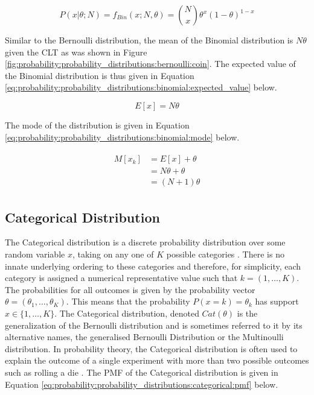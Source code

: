 \begin{equation}
    \label{eq:probability:probability_distributions:binomial:pmf}
    P(x \vert \theta; N) = f_{Bin}(x; N, \theta) = \binom{N}{x} \theta^{x}(1-\theta)^{1-x}
\end{equation}

Similar to the Bernoulli distribution, the mean of the Binomial distribution is $N\theta$ given the \ac{CLT} as was shown in Figure \ref{fig:probability:probability_distributions:bernoulli:coin}. The expected value of the Binomial distribution is thus given in Equation \ref{eq:probability:probability_distributions:binomial:expected_value} below.

\begin{equation}
    \label{eq:probability:probability_distributions:binomial:expected_value}
    E[x] = N\theta
\end{equation}

The mode of the distribution is given in Equation \ref{eq:probability:probability_distributions:binomial:mode} below.

\begin{align}
    \label{eq:probability:probability_distributions:binomial:mode}
    \begin{split}
    M[x_{k}] &= E[x] + \theta \\
    	&= N\theta  + \theta \\
    	&= (N  + 1)\theta
    \end{split}
\end{align}



\subsection{Categorical Distribution}
\label{sec:probability:probability_distributions:categorical}

The Categorical distribution is a discrete probability distribution over some random variable $x$, taking on any one of $K$ possible categories \cite{ref:wackerly:2014}. There is no innate underlying ordering to these categories and therefore, for simplicity, each category is assigned a numerical representative value such that $k = (1, \dots, K)$. The probabilities for all outcomes is given by the probability vector $\theta = (\theta_{1}, \dots, \theta_{K})$.  This means that the probability $P(x=k)=\theta_{k}$ has support $x \in \{1, \dots, K\}$. The Categorical distribution, denoted $Cat(\theta)$ is the generalization of the Bernoulli distribution and is sometimes referred to it by its alternative names, the generalised Bernoulli Distribution or the Multinoulli distribution. In probability theory, the Categorical distribution is often used to explain the outcome of a single experiment with more than two possible outcomes such as rolling a die \cite{ref:wackerly:2014}. The \ac{PMF} of the Categorical distribution is given in Equation \ref{eq:probability:probability_distributions:categorical:pmf} below.

